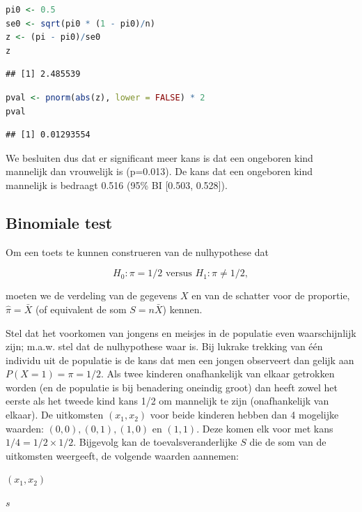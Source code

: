 \documentclass[
  12pt,dutch,coursenotes]{book}
\begin{document}
\begin{lstlisting}[language=R]
pi0 <- 0.5
se0 <- sqrt(pi0 * (1 - pi0)/n)
z <- (pi - pi0)/se0
z
\end{lstlisting}

\begin{lstlisting}
## [1] 2.485539
\end{lstlisting}

\begin{lstlisting}[language=R]
pval <- pnorm(abs(z), lower = FALSE) * 2
pval
\end{lstlisting}

\begin{lstlisting}
## [1] 0.01293554
\end{lstlisting}

We besluiten dus dat er significant meer kans is dat een ongeboren kind mannelijk dan vrouwelijk is (p=0.013). De kans dat een ongeboren kind mannelijk is bedraagt 0.516 (95\% BI {[}0.503, 0.528{]}).

\hypertarget{subsec:binom}{%
\subsection{Binomiale test}\label{subsec:binom}}

Om een toets te kunnen construeren van de nulhypothese
dat

\[H_0: \pi=1/2 \text{ versus } H_1: \pi\neq 1/2,\]

moeten we de verdeling van de
gegevens \(X\) en van de schatter voor de proportie, \(\hat \pi = \bar X\) (of equivalent de som \(S=n\bar X\)) kennen.

Stel dat het voorkomen van jongens en meisjes in de populatie even waarschijnlijk zijn; m.a.w. stel dat de nulhypothese waar is. Bij lukrake trekking
van één individu uit de populatie is de kans dat men een jongen observeert dan gelijk aan \(P(X=1) = \pi = 1/2.\)
Als twee kinderen onafhankelijk van elkaar getrokken worden (en de populatie is bij benadering oneindig groot) dan heeft zowel
het eerste als het tweede kind kans 1/2 om mannelijk te zijn
(onafhankelijk van elkaar). De uitkomsten \((x_1, x_2)\) voor beide kinderen
hebben dan 4 mogelijke waarden: \((0,0), (0,1),(1,0)\) en \((1,1).\) Deze komen
elk voor met kans \(1/4 = 1/2 \times 1/2\). Bijgevolg kan de
toevalsveranderlijke \(S\) die de som van de uitkomsten weergeeft, de
volgende waarden aannemen:

\((x_1,x_2)\)

\(s\)
\end{document}
